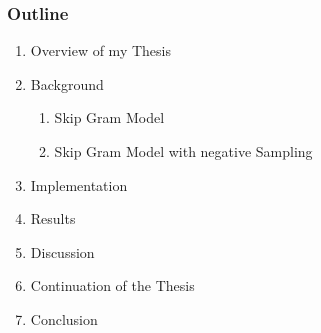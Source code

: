\begin{frame}\frametitle{Outline}
\begin{enumerate}
\item Overview of my Thesis
\item Background
\begin{enumerate}
\item Skip Gram Model
\item Skip Gram Model with negative Sampling
\end{enumerate}
\item Implementation
\item Results
\item Discussion
\item Continuation of the Thesis
\item Conclusion
\end{enumerate}
	
\end{frame}